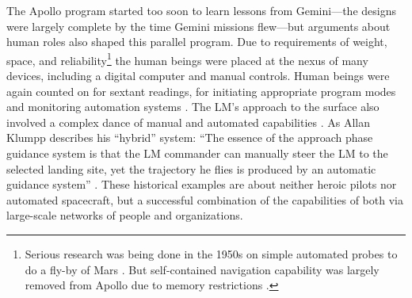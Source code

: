The Apollo program started too soon to learn lessons from
Gemini---the designs were largely complete by the time Gemini
missions flew---but arguments about human roles also shaped this
parallel program. Due to requirements of weight, space, and
reliability\footnote{Serious
research was being done in the 1950s on simple automated probes to do a fly-by of
Mars \cite[p. 1]{battin}. But self-contained navigation capability was
largely removed from Apollo due to memory restrictions
\cite{tindallMay12}.} the human beings were placed at
the nexus of 
many devices, including a digital computer and manual controls. Human beings were
again counted on for sextant readings, for initiating appropriate
program modes and monitoring automation systems \cite[p.
  4]{BennettExperience}. The LM's approach
to the surface also involved a complex dance of manual and automated
capabilities \cite{BennettCheatham}. As Allan Klumpp describes his
``hybrid'' system: ``The essence of the
approach phase guidance system is that the LM commander can manually
steer the LM to the selected landing site, yet the trajectory he flies
is produced by an automatic guidance system'' \cite[p.
  129--130]{Klumpp}. These 
historical examples are about neither heroic pilots nor
automated spacecraft, but a successful combination of the capabilities
of both via large-scale networks of people and organizations.




